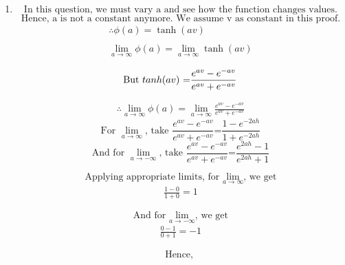 \documentclass[12pt]{article}
\begin{document}
\begin{enumerate}
  \item \[
            \text{In this question, we must vary a and see how the function changes values.}
        \]
        \[
            \text{Hence, a is not a constant anymore. We assume v as constant in this proof.}
        \]
        \begin{gather}
            \therefore\phi(a) = \tanh(av) \nonumber \\ \nonumber\\ 
            \lim_{a\to\infty} \phi(a) = \lim_{a\to\infty}\tanh(av) \label{eqn:2}
        \end{gather}
        
        \[
            \text{But\ $tanh(av)$ =$\frac{e^{av}-e^{-av}}{e^{av}+e^{-av}}$} \\
        \]
        
        \begin{gather}             
            \therefore \lim_{a\to\infty} \phi(a) = \lim_{a\to\infty}\frac{e^{av}-e^{-av}}{e^{av}+e^{-av}} \label{eqn:3}    
        \end{gather}
        \[
            \text{For $\lim_{a\to\infty}$, take $\frac{e^{av}-e^{-av}}{e^{av}+e^{-av}}$=$\frac{1-e^{-2ah}}{1+e^{-2ah}}$}
        \]
        \[
            \text{And for $\lim_{a\to-\infty}$, take $\frac{e^{av}-e^{-av}}{e^{av}+e^{-av}}$=$\frac{e^{2ah}-1}{e^{2ah}+1}$}
        \]
        
        \[
            \text{Applying appropriate limits, for $\lim_{a\to\infty}$, we get} 
        \]
        \begin{gather}
            \frac{1-0}{1+0} = 1
        \end{gather}
        
        \[
            \text{And for $\lim_{a\to-\infty}$, we get} 
        \]
        \begin{gather}
            \frac{0-1}{0+1} = -1
        \end{gather}
       
       \[
            \text{Hence, } 
        \]
\end{enumerate}
\end{document}
